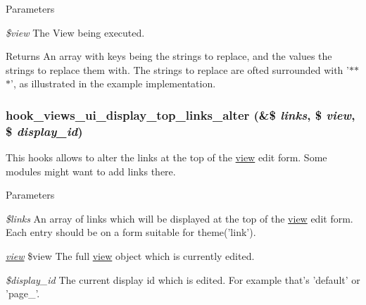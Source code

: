 \begin{DoxyParams}{Parameters}
\item[{\em \$view}]The View being executed. \end{DoxyParams}
\begin{DoxyReturn}{Returns}
An array with keys being the strings to replace, and the values the strings to replace them with. The strings to replace are ofted surrounded with '$\ast$$\ast$$\ast$', as illustrated in the example implementation. 
\end{DoxyReturn}
\hypertarget{group__views__hooks_ga376184982a8ac07a1da0708b4975b6be}{
\subsubsection[{hook\_\-views\_\-ui\_\-display\_\-top\_\-links\_\-alter}]{\setlength{\rightskip}{0pt plus 5cm}hook\_\-views\_\-ui\_\-display\_\-top\_\-links\_\-alter (\&\$ {\em links}, \/  \$ {\em view}, \/  \$ {\em display\_\-id})}}
\label{group__views__hooks_ga376184982a8ac07a1da0708b4975b6be}
This hooks allows to alter the links at the top of the \hyperlink{classview}{view} edit form. Some modules might want to add links there.


\begin{DoxyParams}{Parameters}
\item[{\em \$links}]An array of links which will be displayed at the top of the \hyperlink{classview}{view} edit form. Each entry should be on a form suitable for theme('link'). \item[{\em \hyperlink{classview}{view}}]\$view The full \hyperlink{classview}{view} object which is currently edited. \item[{\em \$display\_\-id}]The current display id which is edited. For example that's 'default' or 'page\_'. \end{DoxyParams}
